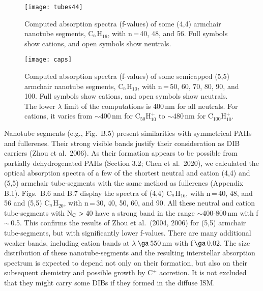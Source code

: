 \documentclass{aa}
\begin{document}
\begin{figure}[htbp]
         \begin{center}
\texttt{[image: tubes44]}
 \caption{Computed absorption spectra (f-values) of some (4,4) armchair nanotube segments, C$_{\rm n}$H$_{16}$, with n\,=\,40, 48, and 56. Full symbols show cations, and open symbols show neutrals.}
     \end{center}
 \end{figure}

\begin{figure*}[htbp]
         \begin{center}
\texttt{[image: caps]}
 \caption{Computed absorption spectra (f-values) of some semicapped (5,5) armchair nanotube segments, C$_{\rm n}$H$_{10}$, with n\,=\,50, 60, 70, 80, 90, and  100. Full symbols show cations, and open symbols show neutrals. The lower $\lambda$ limit of the computations is 400\,nm for all neutrals. For cations, it varies from $\sim$400\,nm for C$_{50}$H$_{10}^+$ to $\sim$480\,nm 
for C$_{100}$H$_{10}^+$.}
     \end{center}
 \end{figure*}

Nanotube segments (e.g., Fig.\ B.5) present similarities with symmetrical PAHs and fullerenes. Their strong visible bands justify their consideration as DIB carriers (Zhou et al.\ 2006).  As their formation appears to be possible from partially dehydrogenated PAHs (Section 3.2; Chen et al.\ 2020), we calculated the optical absorption spectra of a few of the shortest 
neutral and cation (4,4) and (5,5) armchair tube-segments with the same method as fullerenes (Appendix B.1).
 Figs.\ B.6 and B.7 display the spectra of (4,4) C$_{\rm n}$H$_{16}$, with n\,=\,40, 48, and  56 and  (5,5) C$_{\rm n}$H$_{20}$, with n\,=\,30, 40, 50, 60, and  90. %
 All these neutral and cation tube-segments with N$_{\rm C}\,>$\,40 have a strong band in the range $\sim$400-800\,nm with f\,$\sim$\,0.5. This confirms the results of Zhou et al.\ (2004, 2006) for (5,5) armchair tube-segments, but with significantly lower f-values. There are many additional weaker bands, including cation bands at $\lambda$\,$\ga$\,550\,nm with f\,$\ga$\,0.02.   
The size distribution of these nanotube-segments and the resulting interstellar absorption spectrum is  expected to depend not only on their formation, but also on their subsequent chemistry and possible growth by C$^+$ accretion. It is not excluded that they might carry some  DIBs if they formed in the diffuse ISM.
\end{document}
